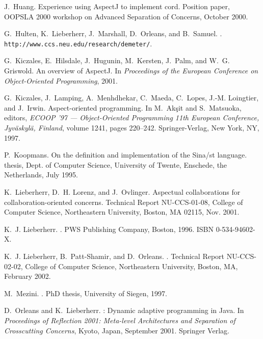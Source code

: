 \documentclass{acm_proc_article-sp}
\begin{document}
\begin{thebibliography}{10}
J.~Huang.
\newblock Experience using {AspectJ} to implement cord.
\newblock Position paper, OOPSLA 2000 workshop on Advanced Separation of
  Concerns, October 2000.

G.~Hulten, K.~Lieberherr, J.~Marshall, D.~Orleans, and B.~Samuel.
.
\newblock \texttt{\\http://www.ccs.neu.edu/research/demeter/}.

G.~Kiczales, E.~Hilsdale, J.~Hugunin, M.~Kersten, J.~Palm, and W.~G. Griswold.
\newblock An overview of {AspectJ}.
\newblock In {\em Proceedings of the European Conference on Object-Oriented
  Programming}, 2001.

G.~Kiczales, J.~Lamping, A.~Menhdhekar, C.~Maeda, C.~Lopes, J.-M. Loingtier,
  and J.~Irwin.
\newblock Aspect-oriented programming.
\newblock In M.~Ak\c{s}it and S.~Matsuoka, editors, {\em {ECOOP} '97 ---
  Object-Oriented Programming 11th European Conference, Jyv{\"a}skyl{\"a},
  Finland}, volume 1241, pages 220--242. Springer-Verlag, New York, NY, 1997.

P.~Koopmans.
\newblock On the definition and implementation of the {Sina/st} language.
 thesis, Dept. of Computer Science, University of Twente,
  Enschede, the Netherlands, July 1995.

K.~Lieberherr, D.~H. Lorenz, and J.~Ovlinger.
\newblock Aspectual collaborations for collaboration-oriented concerns.
\newblock Technical Report {NU-CCS-01-08}, College of Computer Science,
  Northeastern University, Boston, MA 02115, Nov. 2001.

K.~J. Lieberherr.
.
\newblock PWS Publishing Company, Boston, 1996.
\newblock ISBN 0-534-94602-X.

K.~J. Lieberherr, B.~Patt-Shamir, and D.~Orleans.
.
\newblock Technical Report {NU-CCS-02-02}, College of Computer Science,
  Northeastern University, Boston, MA, February 2002.

M.~Mezini.
.
\newblock PhD thesis, University of Siegen, 1997.

D.~Orleans and K.~Lieberherr.
: Dynamic adaptive programming in {Java}.
\newblock In {\em Proceedings of Reflection 2001: Meta-level Architectures and
  Separation of Crosscutting Concerns}, Kyoto, Japan, September 2001. Springer
  Verlag.


\end{thebibliography}
\end{document}
